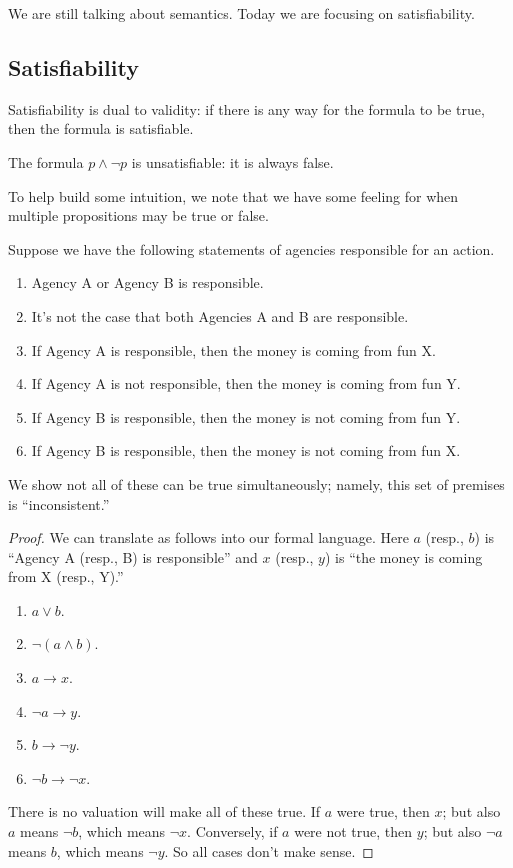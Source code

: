 \documentclass[../notes.tex]{subfiles}
\begin{document}

We are still talking about semantics. Today we are focusing on satisfiability.

\subsection{Satisfiability}
Satisfiability is dual to validity: if there is any way for the formula to be true, then the formula is satisfiable.
\begin{nex}
	The formula $p\land\lnot p$ is unsatisfiable: it is always false.
\end{nex}
To help build some intuition, we note that we have some feeling for when multiple propositions may be true or false.
\begin{exe}
	Suppose we have the following statements of agencies responsible for an action.
	\begin{enumerate}
		\item Agency A or Agency B is responsible.
		\item It's not the case that both Agencies A and B are responsible.
		\item If Agency A is responsible, then the money is coming from fun X.
		\item If Agency A is not responsible, then the money is coming from fun Y.
		\item If Agency B is responsible, then the money is not coming from fun Y.
		\item If Agency B is responsible, then the money is not coming from fun X.
	\end{enumerate}
	We show not all of these can be true simultaneously; namely, this set of premises is ``inconsistent.''
\end{exe}
\begin{proof}
	We can translate as follows into our formal language. Here $a$ (resp., $b$) is ``Agency A (resp., B) is responsible'' and $x$ (resp., $y$) is ``the money is coming from X (resp., Y).''
	\begin{enumerate}
		\item $a\lor b$.
		\item $\lnot(a\land b)$.
		\item $a\to x$.
		\item $\lnot a\to y$.
		\item $b\to\lnot y$.
		\item $\lnot b\to\lnot x$.
	\end{enumerate}
	There is no valuation will make all of these true. If $a$ were true, then $x$; but also $a$ means $\lnot b$, which means $\lnot x$. Conversely, if $a$ were not true, then $y$; but also $\lnot a$ means $b$, which means $\lnot y$. So all cases don't make sense.
\end{proof}
\end{document}
